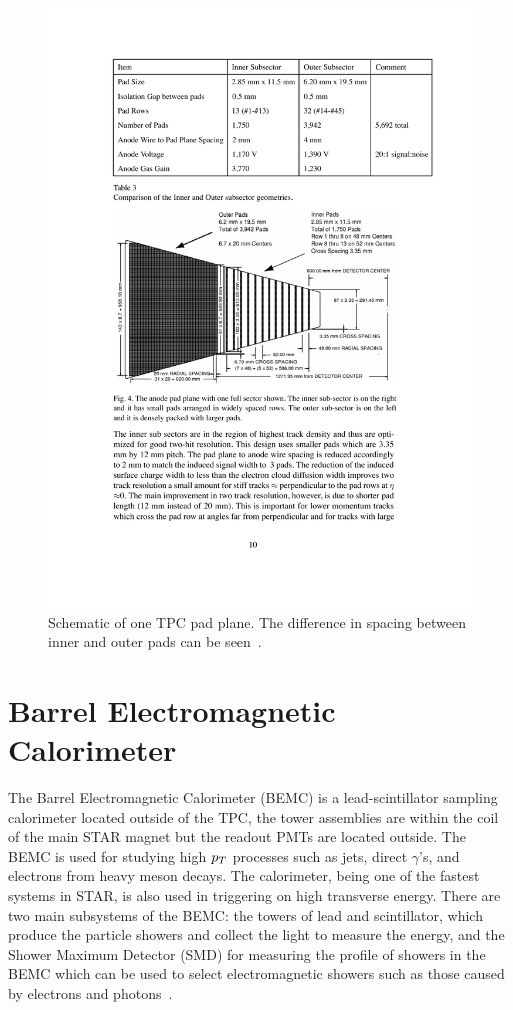 \begin{figure}[htbp]
\begin{center}
\includegraphics[scale=1.0]{Plots/Detector/TPC_pad.pdf}
\end{center}
\caption[TPC Sector]{Schematic of one TPC pad plane. The difference in spacing between inner and outer pads can be seen~\cite{tpcNIM}.}
\label{fig:TPC_pad}
\end{figure}

\section{Barrel Electromagnetic Calorimeter}

The Barrel Electromagnetic Calorimeter (BEMC) is a lead-scintillator sampling calorimeter located outside of the TPC, the tower assemblies are within the coil of the main STAR magnet but the readout PMTs are located outside. The BEMC is used for studying high $p_{T}$ processes such as jets, direct $\gamma$'s, and electrons from heavy meson decays. The calorimeter, being one of the fastest systems in STAR, is also used in triggering on high transverse energy. There are two main subsystems of the BEMC: the towers of lead and scintillator, which produce the particle showers and collect the light to measure the energy, and the Shower Maximum Detector (SMD) for measuring the profile of showers in the BEMC which can be used to select electromagnetic showers such as those caused by electrons and photons~\cite{emcNIM}.

